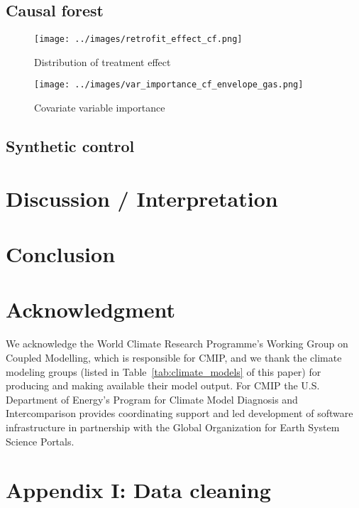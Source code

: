 \documentclass[12pt]{article}
\newcommand{\tref}[1]{Table~\ref{#1}}
\begin{document}
\subsection{Causal forest}
\begin{figure}[H]
  \centering
  \texttt{[image: ../images/retrofit\_effect\_cf.png]}
  \caption[Causal forest prediction]{Distribution of treatment effect}
  \label{fig:retrofit_effect_cf}
\end{figure}

\begin{figure}[H]
  \centering
  \texttt{[image: ../images/var\_importance\_cf\_envelope\_gas.png]}
  \caption[Causal forest variable importance]{Covariate variable importance}
  \label{fig:var_importance_cf_envelope_gas}
\end{figure}

\subsection{Synthetic control}
\section{Discussion / Interpretation}
\section{Conclusion}
\section{Acknowledgment}
We acknowledge the World Climate Research Programme's Working Group on Coupled
Modelling, which is responsible for CMIP, and we thank the climate modeling
groups (listed in \tref{tab:climate_models} of this paper) for producing and making available
their model output. For CMIP the U.S. Department of Energy's Program for Climate
Model Diagnosis and Intercomparison provides coordinating support and led
development of software infrastructure in partnership with the Global
Organization for Earth System Science Portals.

\section{Appendix I: Data cleaning}
\end{document}
